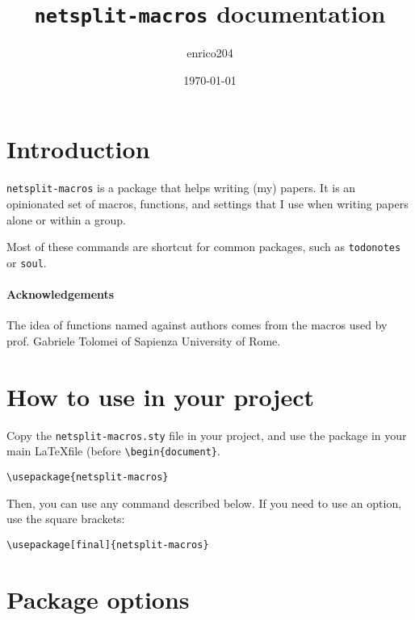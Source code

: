 \documentclass[a4paper]{article}
\title{\texttt{netsplit-macros} documentation}
\author{enrico204}
\date{\today}
\begin{document}
\maketitle

\tableofcontents

\section{Introduction}
\texttt{netsplit-macros} is a package that helps writing (my) papers. It is an opinionated set of macros, functions, and settings that I use when writing papers alone or within a group.

Most of these commands are shortcut for common packages, such as \texttt{todonotes} or \texttt{soul}.

\paragraph{Acknowledgements} The idea of functions named against authors comes from the macros used by prof. Gabriele Tolomei of Sapienza University of Rome.

\section{How to use in your project}

Copy the \texttt{netsplit-macros.sty} file in your project, and use the package in your main \LaTeX file (before \texttt{\textbackslash begin\{document\}}.

\begin{verbatim}
\usepackage{netsplit-macros}
\end{verbatim}

Then, you can use any command described below. If you need to use an option, use the square brackets:

\begin{verbatim}
\usepackage[final]{netsplit-macros}
\end{verbatim}


\section{Package options}
\label{sec:options}
\end{document}
